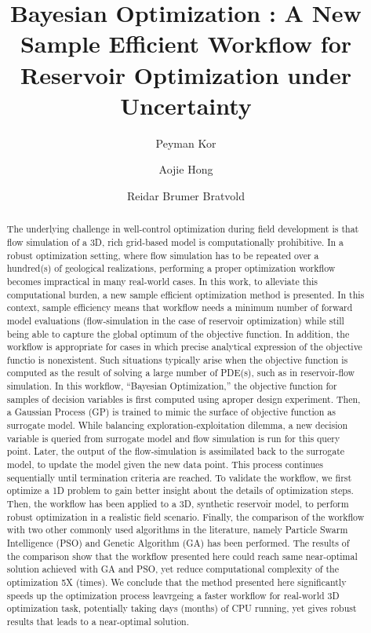\documentclass[]{elsarticle} %
\begin{document}
\begin{frontmatter}

  \title{Bayesian Optimization : A New Sample Efficient Workflow for Reservoir Optimization under Uncertainty}
    \author[a]{Peyman Kor}
  
    \author[a]{Aojie Hong}
  
    \author[a]{Reidar Brumer Bratvold}
  
      \address[a]{Energy Resources Department, University of Stavanger, Stavanger, Norway}
  
  \begin{abstract}
  \doublespacing The underlying challenge in well-control optimization during field development is that flow simulation of a 3D, rich grid-based model is computationally prohibitive. In a robust optimization setting, where flow simulation has to be repeated over a hundred(s) of geological realizations, performing a proper optimization workflow becomes impractical in many real-world cases. In this work, to alleviate this computational burden, a new sample efficient optimization method is presented. In this context, sample efficiency means that workflow needs a minimum number of forward model evaluations (flow-simulation in the case of reservoir optimization) while still being able to capture the global optimum of the objective function. In addition, the workflow is appropriate for cases in which precise analytical expression of the objective functio is nonexistent. Such situations typically arise when the objective function is computed as the result of solving a large number of PDE(s), such as in reservoir-flow simulation. In this workflow, ``Bayesian Optimization,'' the objective function for samples of decision variables is first computed using aproper design experiment. Then, a Gaussian Process (GP) is trained to mimic the surface of objective function as surrogate model. While balancing exploration-exploitation dilemma, a new decision variable is queried from surrogate model and flow simulation is run for this query point. Later, the output of the flow-simulation is assimilated back to the surrogate model, to update the model given the new data point. This process continues sequentially until termination criteria are reached. To validate the workflow, we first optimize a 1D problem to gain better insight about the details of optimization steps. Then, the workflow has been applied to a 3D, synthetic reservoir model, to perform robust optimization in a realistic field scenario. Finally, the comparison of the workflow with two other commonly used algorithms in the literature, namely Particle Swarm Intelligence (PSO) and Genetic Algorithm (GA) has been performed. The results of the comparison show that the workflow presented here could reach same near-optimal solution achieved with GA and PSO, yet reduce computational complexity of the optimization 5X (times). We conclude that the method presented here significantly speeds up the optimization process leavrgeing a faster workflow for real-world 3D optimization task, potentially taking days (months) of CPU running, yet gives robust results that leads to a near-optimal solution.

\end{abstract}
\end{frontmatter}
\end{document}
